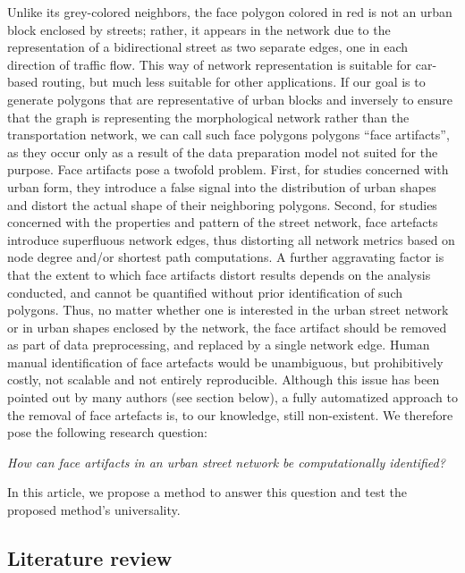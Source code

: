 Unlike its grey-colored neighbors, the face polygon colored in red is not an urban block enclosed by streets; rather, it appears in the network due to the representation of a bidirectional street as two separate edges, one in each direction of traffic flow. This way of network representation is suitable for car-based routing, but much less suitable for other applications. If our goal is to generate polygons that are representative of urban blocks and inversely to ensure that the graph is representing the morphological network rather than the transportation network, we can call such face polygons polygons ``face artifacts'', as they occur only as a result of the data preparation model not suited for the purpose. Face artifacts pose a twofold problem. First, for studies concerned with urban form, they introduce a false signal into the distribution of urban shapes and distort the actual shape of their neighboring polygons. Second, for studies concerned with the properties and pattern of the street network, face artefacts introduce superfluous network edges, thus distorting all network metrics based on node degree and/or shortest path computations. A further aggravating factor is that the extent to which face artifacts distort results depends on the analysis conducted, and cannot be quantified without prior identification of such polygons. Thus, no matter whether one is interested in the urban street network or in urban shapes enclosed by the network, the face artifact should be removed as part of data preprocessing, and replaced by a single network edge. Human manual identification of face artefacts would be unambiguous, but prohibitively costly, not scalable and not entirely reproducible. Although this issue has been pointed out by many authors (see section below), a fully automatized approach to the removal of face artefacts is, to our knowledge, still non-existent. We therefore pose the following research question:

\begin{center}
\textit{How can face artifacts in an urban street network be computationally identified?}
\end{center}

In this article, we propose a method to answer this question and test the proposed method’s universality. 

\subsection*{Literature review}


